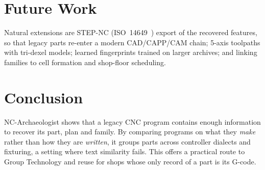\documentclass[conference]{IEEEtran}
\begin{document}
\section{Future Work}
Natural extensions are STEP-NC (ISO~14649~\cite{iso14649}) export of the
recovered features, so that legacy parts re-enter a modern CAD/CAPP/CAM chain;
5-axis toolpaths with tri-dexel models; learned fingerprints trained on larger
archives; and linking families to cell formation and shop-floor scheduling.

\section{Conclusion}
NC-Archaeologist shows that a legacy CNC program contains enough information
to recover its part, plan and family. By comparing programs on what they
\emph{make} rather than how they are \emph{written}, it groups parts across
controller dialects and fixturing, a setting where text similarity fails. This
offers a practical route to Group Technology and reuse for shops whose only
record of a part is its G-code.
\end{document}
